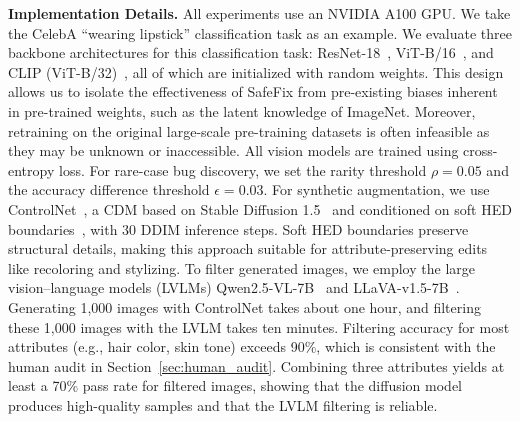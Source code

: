 \documentclass[10pt]{article} %
\newcommand{\controlnet}{ControlNet\xspace}
\newcommand{\qwen}{Qwen2.5-VL\xspace}
\newcommand{\llava}{LLaVA-v1.5\xspace}
\begin{document}
\noindent \textbf{Implementation Details.} All experiments use an NVIDIA A100 GPU\@.
We take the CelebA ``wearing lipstick'' classification task as an example.  
We evaluate three backbone architectures for this classification task: ResNet-18~\citep{he2016deep}, ViT-B/16~\citep{dosovitskiy2020vit}, and CLIP (ViT-B/32)~\citep{radford2021learning}, all of which are initialized with random weights. This design allows us to isolate the effectiveness of SafeFix from pre-existing biases inherent in pre-trained weights, such as the latent knowledge of ImageNet. Moreover, retraining on the original large-scale pre-training datasets is often infeasible as they may be unknown or inaccessible. All vision models are trained using cross-entropy loss. For rare-case bug discovery, we set the rarity threshold \(\rho = 0.05\) and the accuracy difference threshold \(\epsilon = 0.03\). For synthetic augmentation, we use \controlnet~\citep{zhang2023adding}, a CDM based on Stable Diffusion 1.5~\citep{rombach2022high} and conditioned on soft HED boundaries~\citep{xie2015holistically}, with 30 DDIM inference steps. Soft HED boundaries preserve structural details, making this approach suitable for attribute-preserving edits like recoloring and stylizing.
To filter generated images, we employ the large vision--language models (LVLMs) \qwen{}-7B~\citep{bai2025qwen25vl} and \llava{}-7B~\citep{liu2023improvedllava}. Generating 1,000 images with ControlNet takes about one hour, and filtering these 1,000 images with the LVLM takes ten minutes. Filtering accuracy for most attributes (e.g., hair color, skin tone) exceeds 90\%, which is consistent with the human audit in Section~\ref{sec:human_audit}. Combining three attributes yields at least a 70\% pass rate for filtered images, showing that the diffusion model produces high-quality samples and that the LVLM filtering is reliable.
\end{document}
